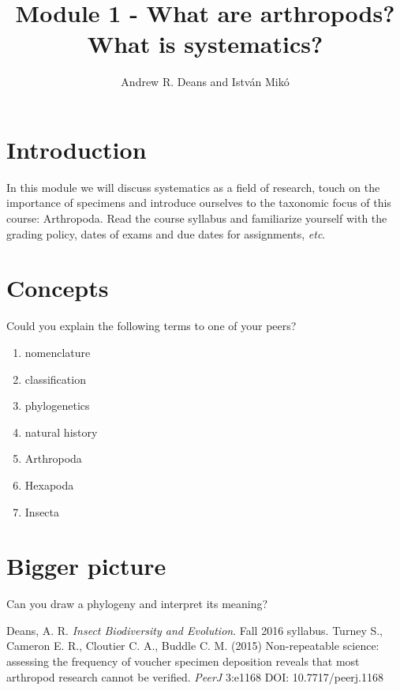 \documentclass[11pt,letterpaper]{article}
\title{Module 1 - What are arthropods? What is systematics?}
\author{Andrew R. Deans and Istv\'an Mik\'o}
\begin{document}
\cleanlookdateon %
\maketitle
\thispagestyle{fancy}
\section*{Introduction}
In this module we will discuss systematics as a field of research, touch on the importance of specimens \cite{voucher} and introduce ourselves to the taxonomic focus of this course: Arthropoda. Read the course syllabus \cite{syllabus} and familiarize yourself with the grading policy, dates of exams and due dates for assignments, \textit{etc}.
\section*{Concepts}
Could you explain the following terms to one of your peers?

\begin{enumerate} 
\item{nomenclature} 
\item{classification}  
\item{phylogenetics}  
\item{natural history}
\item{Arthropoda}  
\item{Hexapoda}  
\item{Insecta}  
\end{enumerate}

\section*{Bigger picture}
Can you draw a phylogeny and interpret its meaning?

\begin{thebibliography}{9}%
 Deans, A. R. \textit{Insect Biodiversity and Evolution}. Fall 2016 syllabus.
 Turney S., Cameron E. R., Cloutier C. A., Buddle C. M. (2015) Non-repeatable science: assessing the frequency of voucher specimen deposition reveals that most arthropod research cannot be verified. \textit{PeerJ} 3:e1168 DOI: 10.7717/peerj.1168
\end{thebibliography}
\end{document}
